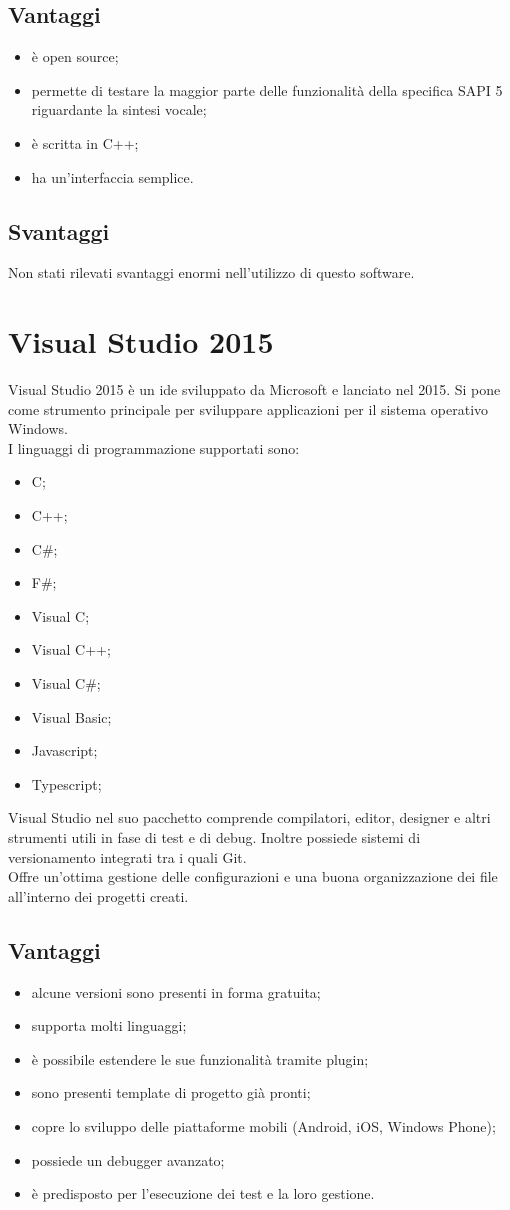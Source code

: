 \subsection*{Vantaggi}
\begin{itemize}
	\item è open source;
	\item permette di testare la maggior parte delle funzionalità della specifica SAPI 5 riguardante la sintesi vocale;
	\item è scritta in C++;
	\item ha un'interfaccia semplice.
\end{itemize}
\subsection*{Svantaggi}
Non stati rilevati svantaggi enormi nell'utilizzo di questo software.
\section{Visual Studio 2015}
Visual Studio 2015 è un \gls{ide} sviluppato da Microsoft e lanciato nel 2015. Si pone come strumento principale per sviluppare applicazioni per il sistema operativo Windows.\\ 
I linguaggi di programmazione supportati sono:
\begin{itemize}
	\item C;
	\item C++;
	\item C\#;
	\item F\#;
	\item Visual C;
	\item Visual C++;
	\item Visual C\#;
	\item Visual Basic;
	\item Javascript;
	\item Typescript;
\end{itemize}
Visual Studio nel suo pacchetto comprende compilatori, editor, designer e altri strumenti utili in fase di test e di debug. Inoltre possiede sistemi di versionamento integrati tra i quali Git.\\
Offre un'ottima gestione delle configurazioni e una buona organizzazione dei file all'interno dei progetti creati.
\subsection*{Vantaggi}
\begin{itemize}
	\item alcune versioni sono presenti in forma gratuita;
	\item supporta molti linguaggi;
	\item è possibile estendere le sue funzionalità tramite plugin;
	\item sono presenti template di progetto già pronti;
	\item copre lo sviluppo delle piattaforme mobili (Android, iOS, Windows Phone);
	\item possiede un debugger avanzato;
	\item è predisposto per l'esecuzione dei test e la loro gestione.
\end{itemize}
